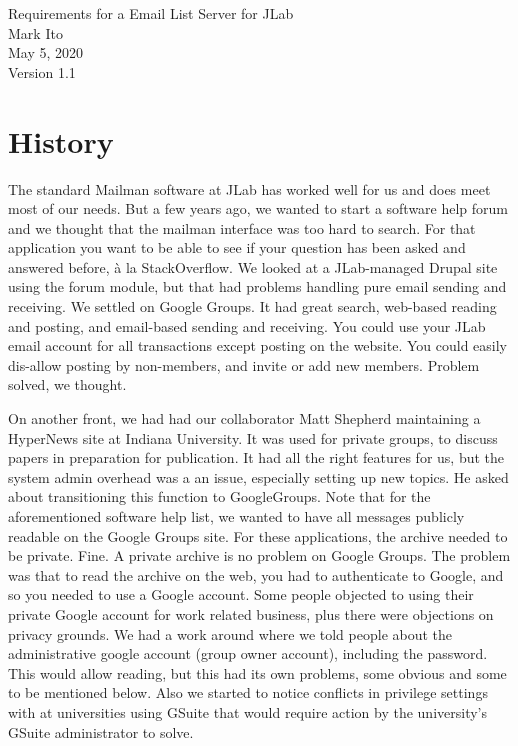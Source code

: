 \documentclass{article}
\begin{document}
\begin{center}
  {\Large Requirements for a Email List Server for JLab} \\
  \medskip
  {\large Mark Ito \\
    May 5, 2020} \\
  Version 1.1
\end{center}

\section{History}

The standard Mailman software at JLab has worked well for us and does
meet most of our needs. But a few years ago, we wanted to start a
software help forum and we thought that the mailman interface was too
hard to search. For that application you want to be able to see if
your question has been asked and answered before, \` a la StackOverflow. We looked at a
JLab-managed Drupal site using the forum module, but that had problems
handling pure email sending and receiving. We settled on Google
Groups. It had great search, web-based reading and posting, and
email-based sending and receiving. You could use your JLab email
account for all transactions except posting on the website. You could
easily dis-allow posting by non-members, and invite or add new
members. Problem solved, we thought.

On another front, we had had our collaborator Matt Shepherd
maintaining a HyperNews site at Indiana University. It was used for
private groups, to discuss papers in preparation for publication. It
had all the right features for us, but the system admin overhead was a
an issue, especially setting up new topics. He asked about
transitioning this function to GoogleGroups. Note that for the
aforementioned software help list, we wanted to have all messages
publicly readable on the Google Groups site. For these applications,
the archive needed to be private. Fine. A private archive is no
problem on Google Groups. The problem was that to read the archive on
the web, you had to authenticate to Google, and so you needed to use a
Google account. Some people objected to using their private Google
account for work related business, plus there were objections on
privacy grounds. We had a work around where we told people about the
administrative google account (group owner account), including the
password. This would allow reading, but this had its own problems,
some obvious and some to be mentioned below. Also we started to notice
conflicts in privilege settings with at universities using GSuite that
would require action by the university's GSuite administrator to
solve.
\end{document}
